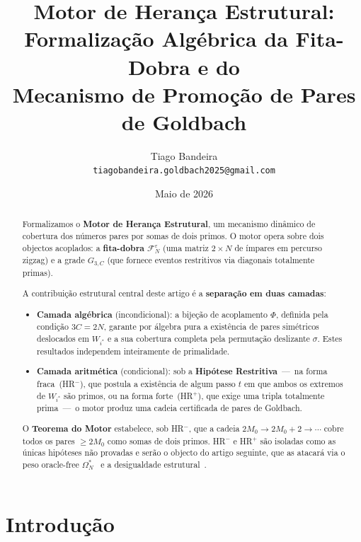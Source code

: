 \documentclass[12pt, a4paper]{article}
\title{Motor de Herança Estrutural:\\
	Formalização Algébrica da Fita-Dobra e do\\
	Mecanismo de Promoção de Pares de Goldbach}
\author{Tiago Bandeira\\
	\small\texttt{tiagobandeira.goldbach2025@gmail.com}}
\date{Maio de 2026}
\theoremstyle{plain}
\theoremstyle{definition}
\theoremstyle{remark}
\begin{document}
	
	\maketitle
	
	\begin{abstract}
		Formalizamos o \textbf{Motor de Herança Estrutural}, um mecanismo
		dinâmico de cobertura dos números pares por somas de dois primos.
		O motor opera sobre dois objectos acoplados: a \textbf{fita-dobra}
		$\mathcal{F}_N^\varepsilon$ (uma matriz $2\times N$ de ímpares em
		percurso zigzag) e a grade $G_{3,C}$ (que fornece eventos restritivos
		via diagonais totalmente primas).
		
		A contribuição estrutural central deste artigo é a
		\textbf{separação em duas camadas}:
		\begin{itemize}
			\item \textbf{Camada algébrica} (incondicional): a bijeção de
			acoplamento $\Phi$, definida pela condição $3C=2N$, garante
			por álgebra pura a existência de pares simétricos deslocados
			em $W_{i^*}$ e a sua cobertura completa pela permutação
			deslizante $\sigma$.  Estes resultados independem
			inteiramente de primalidade.
			\item \textbf{Camada aritmética} (condicional): sob a
			\textbf{Hipótese Restritiva}~---~na forma fraca~(HR$^-$),
			que postula a existência de algum passo $t$ em que ambos os
			extremos de $W_{i^*}$ são primos, ou na forma
			forte~(HR$^+$), que exige uma tripla totalmente prima~---~o
			motor produz uma cadeia certificada de pares de Goldbach.
		\end{itemize}
		
		O \textbf{Teorema do Motor} estabelece, sob HR$^-$, que a cadeia
		$2M_0\to2M_0+2\to\cdots$ cobre todos os pares $\geq2M_0$ como somas
		de dois primos.  HR$^-$ e HR$^+$ são isoladas como as únicas
		hipóteses não provadas e serão o objecto do artigo seguinte, que as
		atacará via o peso oracle-free $\Omega_N^*$~\cite{peso} e a
		desigualdade estrutural~\cite{problemaB}.
	\end{abstract}
	
	\tableofcontents
	
	\section{Introdução}
	
\end{document}
